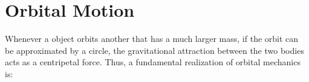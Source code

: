 	
	
	
	
	\section{Orbital Motion} 
	Whenever a object orbits another that has a much larger mass, if the orbit can be approximated by a circle, the gravitational attraction between the two bodies acts as a centripetal force.  Thus, a fundamental realization of orbital mechanics is:
	

		


	



